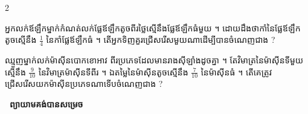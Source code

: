 \documentclass[theme=teal]{khmermath}
\def\splitnum#1#2{%
  \color{koreaNumber!65}#1\color{koreaOrange}#2%
}
\newcommand{\koreannum}[1]{%
  \ifstrempty{#1}{}{%
    \mbox{%
      \fontsize{15}{15}\selectfont\bfseries%
      \ifnum#1<10\relax%
        \color{koreaNumber!65}0\color{koreaOrange}#1%
      \else%
        \expandafter\splitnum#1%
      \fi%
    }\,\ %
  }%
}
\newcommand{\exhead}[1]{%
  \koreannum{#1}%
}
\begin{document}
\begin{multicols}{2}
  \noindent\begin{minipage}{\linewidth}
    \exhead{10} អ្នកលក់ឪឡឹកម្នាក់កំណត់លក់ផ្លែឪឡឹកតូចពីរថ្លៃស្មើនឹងផ្លែឪឡឹកធំមួយ ។ ដោយដឹងថាកាំនៃផ្លែឪឡឹកតូចស្មើនឹង $\frac{1}{4}$ នៃកាំផ្លែឪឡឹកធំ ។ តើអ្នកទិញគួរជ្រើសរើសមួយណាដើម្បីបានចំណេញជាង ?
  \end{minipage}\par\vspace{5pt}

  \noindent\begin{minipage}{\linewidth}
    \exhead{11} ឈ្មួញម្នាក់លក់ម៉ាស៊ីនបោកខោអាវ ពីរប្រភេទដែលមានរាងស៊ីឡាំងដូចគ្នា ។ តែវិមាត្រនៃម៉ាស៊ីនទីមួយស្មើនឹង $\frac{9}{10}$ នៃវិមាត្រម៉ាស៊ីនទីពីរ ។ ឯតម្លៃនៃម៉ាស៊ីនតូចស្មើនឹង $\frac{7}{10}$ នៃម៉ាស៊ីនធំ ។ តើគេត្រូវជ្រើសរើសយកម៉ាស៊ីនប្រភេទណាទើបចំណេញជាង ?
  \end{minipage}\par\vspace{5pt}
\end{multicols}

\vspace{6pt}
\noindent
\begin{tcolorbox}[
  enhanced,
  colframe=brandNavy!50,
  colback=brandTealBg,
  boxrule=0.7pt,
  arc=5pt,
  halign=center,
  valign=center,
  top=4pt, bottom=4pt
]
  \fontsize{10}{10}\selectfont\kml\bfseries\color{brandCrimson}
  \ ព្យាយាមគង់បានសម្រេច 
\end{tcolorbox}
\end{document}
